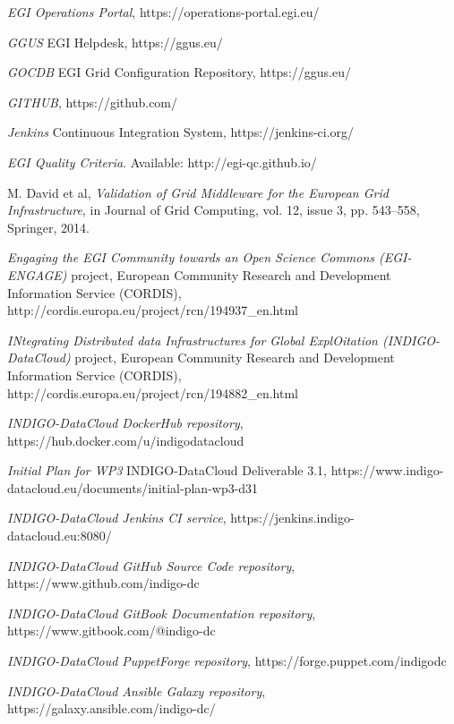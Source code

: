 \documentclass[journal]{IEEEtran}
\begin{document}
\begin{thebibliography}{1}
\emph{EGI Operations Portal},
https://operations-portal.egi.eu/

\emph{GGUS} EGI Helpdesk,
https://ggus.eu/

\emph{GOCDB} EGI Grid Configuration Repository,
https://ggus.eu/

\emph{GITHUB},
https://github.com/

\emph{Jenkins} Continuous Integration System,
https://jenkins-ci.org/

\emph{EGI Quality Criteria}. Available: http://egi-qc.github.io/

M. David et al, \emph{Validation of Grid Middleware for the European Grid
Infrastructure}, in Journal of Grid Computing, vol. 12, issue 3, pp. 543–558,
Springer, 2014.

\emph{Engaging the EGI Community towards an Open Science Commons (EGI-ENGAGE)}
project, European Community Research and Development Information Service
(CORDIS), http://cordis.europa.eu/project/rcn/194937\_en.html

\emph{INtegrating Distributed data Infrastructures for Global ExplOitation
(INDIGO-DataCloud)} project, European Community Research and Development
Information Service (CORDIS),
http://cordis.europa.eu/project/rcn/194882\_en.html

\emph{INDIGO-DataCloud DockerHub repository},
https://hub.docker.com/u/indigodatacloud

\emph{Initial Plan for WP3} INDIGO-DataCloud Deliverable 3.1,
https://www.indigo-datacloud.eu/documents/initial-plan-wp3-d31

\emph{INDIGO-DataCloud Jenkins CI service},
https://jenkins.indigo-datacloud.eu:8080/

\emph{INDIGO-DataCloud GitHub Source Code repository},
https://www.github.com/indigo-dc

\emph{INDIGO-DataCloud GitBook Documentation repository},
https://www.gitbook.com/@indigo-dc

\emph{INDIGO-DataCloud PuppetForge repository},
https://forge.puppet.com/indigodc

\emph{INDIGO-DataCloud Ansible Galaxy repository},
https://galaxy.ansible.com/indigo-dc/


\end{thebibliography}
\end{document}
